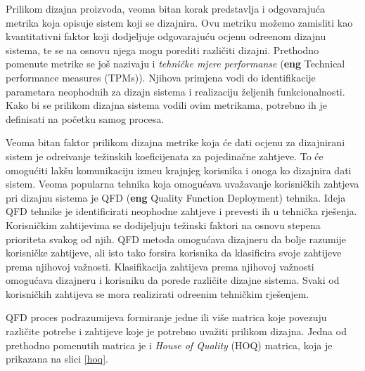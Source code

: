 \documentclass[12pt]{article}
\begin{document}
Prilikom dizajna proizvoda, veoma bitan korak predstavlja i odgovaraju\'ca metrika koja opisuje sistem koji se dizajnira. Ovu metriku mo\v{z}emo zamisliti kao kvantitativni faktor koji dodjeljuje odgovaraju\'cu ocjenu odre\dj enom dizajnu sistema, te se na osnovu njega mogu porediti razli\v{c}iti dizajni. Prethodno pomenute metrike se jo\v{s} nazivaju i \textit{tehni\v{c}ke mjere performanse} (\textbf{eng} Technical performance measures (TPMs)). Njihova primjena vodi do identifikacije parametara neophodnih za dizajn sistema i realizaciju \v{z}eljenih funkcionalnosti. Kako bi se prilikom dizajna sistema vodili ovim metrikama, potrebno ih je definisati na po\v{c}etku samog procesa. 

Veoma bitan faktor prilikom dizajna metrike koja \'ce dati ocjenu za dizajnirani sistem je odre\dj ivanje te\v{z}inskih koeficijenata za pojedina\v{c}ne zahtjeve. To \'ce omogu\'citi lak\v{s}u komunikaciju izme\dj u krajnjeg korisnika i onoga ko dizajnira dati sistem. Veoma popularna tehnika koja omogu\'cava uva\v{z}avanje korisni\v{c}kih zahtjeva pri dizajnu sistema je QFD (\textbf{eng} Quality Function Deployment) tehnika. Ideja QFD tehnike je identificirati neophodne zahtjeve i prevesti ih u tehni\v{c}ka rje\v{s}enja. Korisni\v{c}kim zahtijevima se dodijeljuju te\v{z}inski faktori na osnovu stepena prioriteta svakog od njih. QFD metoda omogu\'cava dizajneru da bolje razumije korisni\v{c}ke zahtijeve, ali isto tako forsira korisnika da klasificira svoje zahtijeve prema njihovoj va\v{z}nosti. Klasifikacija zahtijeva prema njihovoj va\v{z}nosti omogu\'cava dizajneru i korisniku da porede razli\v{c}ite dizajne sistema. Svaki od korisni\v{c}kih zahtijeva se mora realizirati odre\dj enim tehni\v{c}kim rje\v{s}enjem. 

\newpage

QFD proces podrazumijeva formiranje jedne ili vi\v{s}e matrica koje povezuju razli\v{c}ite potrebe i zahtijeve koje je potrebno uva\v{z}iti prilikom dizajna. Jedna od prethodno pomenutih matrica je i \textit{House of Quality} (HOQ) matrica, koja je prikazana na slici \ref{hoq}.  
\end{document}
